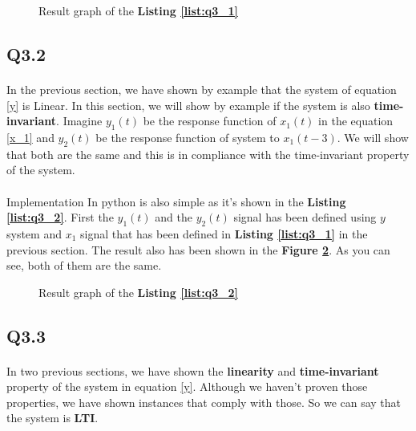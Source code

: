 \begin{figure}[H]
  \centering
  \scalebox{0.4}{}
  \caption{Result graph of the \textbf{Listing \ref{list:q3_1}}}
  \label{fig:Q3_1}
\end{figure}

\subsection{Q3.2}

\paragraph{}In the previous section, we have shown by example 
that the system of equation \ref{y} is Linear. In this
 section, we will show by example if the system is also
  \textbf{time-invariant}. Imagine $y_1(t)$ be the 
  response function of $x_1(t)$ in the equation 
  \ref{x_1} and $y_2(t)$ be the response function 
  of system to $x_1(t-3)$. We will show that both are 
  the same and this is in compliance with the 
  time-invariant property of the system.

\paragraph{}Implementation In python is also simple as 
it's shown in the \textbf{Listing \ref{list:q3_2}}. First the 
$y_1(t)$ and the $y_2(t)$ signal has been defined 
using $y$ system and $x_1$ signal that has been 
defined in \textbf{ Listing \ref{list:q3_1}} in the previous 
section. The result also has been shown in the 
\textbf{Figure \ref{fig:Q3_2}}. As you can see, both of them 
are the same.


\begin{figure}[H]
  \centering
  \scalebox{0.4}{}
  \caption{Result graph of the \textbf{Listing \ref{list:q3_2}}}
  \label{fig:Q3_2}
\end{figure}
\subsection{Q3.3}
\paragraph{}In two previous sections, we have shown 
the \textbf{linearity} and \textbf{time-invariant}
 property of the system in equation \ref{y}. Although 
 we haven't proven those properties, we have shown 
 instances that comply with those. So we can say that 
 the system is \textbf{LTI}.
